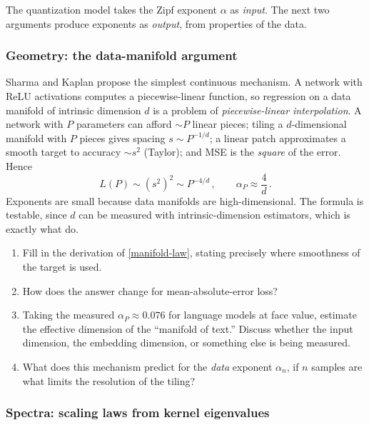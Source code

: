 \documentclass[11pt]{article}
\begin{document}
The quantization model takes the Zipf exponent $\alpha$ as \emph{input}. The next two arguments produce exponents as \emph{output}, from properties of the data.

\subsubsection{Geometry: the data-manifold argument}

Sharma and Kaplan \cite{sharma2020neural} propose the simplest continuous mechanism. A network with ReLU activations computes a piecewise-linear function, so regression on a data manifold of intrinsic dimension $d$ is a problem of \emph{piecewise-linear interpolation}. A network with $P$ parameters can afford $\sim P$ linear pieces; tiling a $d$-dimensional manifold with $P$ pieces gives spacing $s \sim P^{-1/d}$; a linear patch approximates a smooth target to accuracy $\sim s^2$ (Taylor); and MSE is the \emph{square} of the error. Hence
%
\begin{equation} \label{manifold-law}
    L(P) \sim (s^2)^2 \sim P^{-4/d}\,,\qquad \alpha_P \approx \frac{4}{d}\,.
\end{equation}
%
Exponents are small because data manifolds are high-dimensional. The formula is testable, since $d$ can be measured with intrinsic-dimension estimators, which is exactly what \cite{sharma2020neural} do.

\begin{exercise}
\label{ex:manifold}
\begin{enumerate}
  \item Fill in the derivation of \eqref{manifold-law}, stating precisely where smoothness of the target is used.
  \item How does the answer change for mean-absolute-error loss?
  \item Taking the measured $\alpha_P\approx0.076$ for language models at face value, estimate the effective dimension of the ``manifold of text.'' Discuss whether the input dimension, the embedding dimension, or something else is being measured.
  \item What does this mechanism predict for the \emph{data} exponent $\alpha_n$, if $n$ samples are what limits the resolution of the tiling?
\end{enumerate}
\end{exercise}


\subsubsection{Spectra: scaling laws from kernel eigenvalues}
\end{document}
